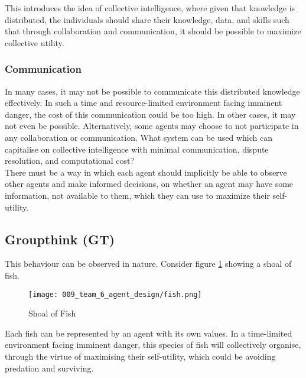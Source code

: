This introduces the idea of collective intelligence, where given that knowledge is distributed, the  individuals should share their knowledge, data, and skills such that through collaboration and communication, it should be possible to maximize collective utility.

\subsubsection{Communication}
In many cases, it may not be possible to communicate this distributed knowledge effectively. In such a time and resource-limited environment facing imminent danger, the cost of this communication could be too high. In other cases, it may not even be possible. Alternatively, some agents may choose to not participate in any collaboration or communication.  What system can be used which can capitalise on collective intelligence with minimal communication, dispute resolution, and computational cost? \\ 

There must be a way in which each agent should implicitly be able to observe other agents and make informed decisions, on whether an agent may have some information, not available to them, which they can use to maximize their self-utility.

\subsection{Groupthink (GT)}
This behaviour can be observed in nature. Consider figure \ref{fig:T6Fish} showing a shoal of fish. \\

\begin{figure}[h]           %
	\centering				%
	\texttt{[image: 009\_team\_6\_agent\_design/fish.png]}			%
    \caption{Shoal of Fish}
	\label{fig:T6Fish}			%
\end{figure}

Each fish can be represented by an agent with its own values. In a time-limited environment facing imminent danger, this species of fish will collectively organise, through the virtue of maximising their self-utility, which could be avoiding predation and surviving.\\

